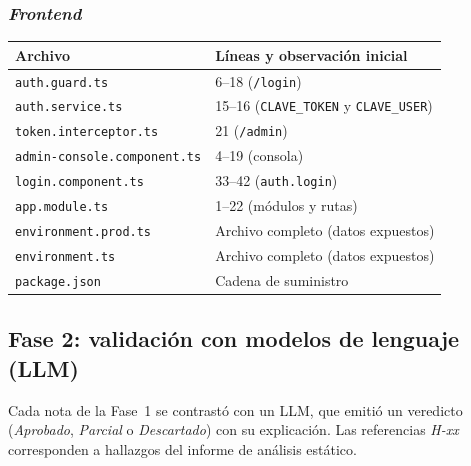 \documentclass[11pt,letterpaper]{article}
\newcommand{\f}[1]{\texttt{#1}}
\newcommand{\enc}[1]{\textbf{#1}}
\begin{document}
\subsubsection*{\textit{Frontend}}
\begin{center}
\begin{tabular}{p{5.5cm}p{7.5cm}}
\toprule
\enc{Archivo} & \enc{Líneas y observación inicial} \\
\midrule
\f{auth.guard.ts} & 6--18 (\f{/login}) \\
\f{auth.service.ts} & 15--16 (\f{CLAVE\_TOKEN} y \f{CLAVE\_USER}) \\
\f{token.interceptor.ts} & 21 (\f{/admin}) \\
\f{admin-console.component.ts} & 4--19 (consola) \\
\f{login.component.ts} & 33--42 (\f{auth.login}) \\
\f{app.module.ts} & 1--22 (módulos y rutas) \\
\f{environment.prod.ts} & Archivo completo (datos expuestos) \\
\f{environment.ts} & Archivo completo (datos expuestos) \\
\f{package.json} & Cadena de suministro \\
\bottomrule
\end{tabular}
\end{center}

\subsection{Fase 2: validación con modelos de lenguaje (LLM)}

Cada nota de la Fase~1 se contrastó con un LLM, que emitió un veredicto (\textit{Aprobado}, \textit{Parcial} o \textit{Descartado}) con su explicación. Las referencias \textit{H-xx} corresponden a hallazgos del informe de análisis estático.
\end{document}
